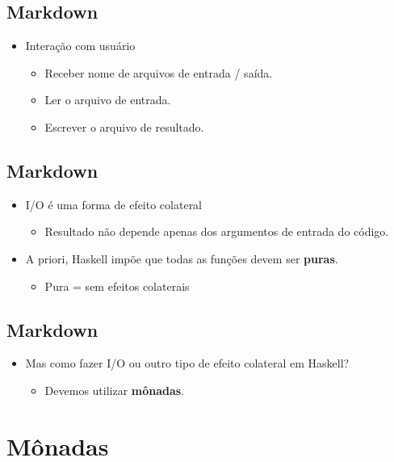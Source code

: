 \documentclass[11pt]{article}
\begin{document}
\subsection*{Markdown}
\label{sec:org3b8cd02}

\begin{itemize}
\item Interação com usuário
\begin{itemize}
\item Receber nome de arquivos de entrada / saída.
\item Ler o arquivo de entrada.
\item Escrever o arquivo de resultado.
\end{itemize}
\end{itemize}
\subsection*{Markdown}
\label{sec:orgf5d878f}

\begin{itemize}
\item I/O é uma forma de efeito colateral
\begin{itemize}
\item Resultado não depende apenas dos argumentos de entrada do código.
\end{itemize}

\item A priori, Haskell impõe que todas as funções devem ser \textbf{puras}.
\begin{itemize}
\item Pura = sem efeitos colaterais
\end{itemize}
\end{itemize}
\subsection*{Markdown}
\label{sec:org0c1bcb2}

\begin{itemize}
\item Mas como fazer I/O ou outro tipo de efeito colateral em Haskell?
\begin{itemize}
\item Devemos utilizar \textbf{mônadas}.
\end{itemize}
\end{itemize}
\section*{Mônadas}
\label{sec:org61f7d6b}
\end{document}
